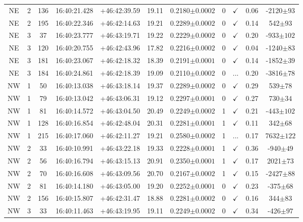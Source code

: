 \begin{landscape}
\begin{longtable}{ccccccccccc}
	NE & 2 & 136 & 16:40:21.428 & +46:42:39.59 & 19.11 & 0.2180$\pm{0.0002}$ & 0 & $\checkmark$ & 0.06 & -2120$\pm{93}$ \\
	NE & 2 & 195 & 16:40:22.346 & +46:42:14.63 & 19.21 & 0.2289$\pm{0.0002}$ & 0 & $\checkmark$ & 0.14 & 542$\pm{93}$ \\
	NE & 3 & 37 & 16:40:23.777 & +46:43:19.71 & 19.22 & 0.2229$\pm{0.0002}$ & 0 & $\checkmark$ & 0.20 & -933$\pm{102}$ \\
	NE & 3 & 120 & 16:40:20.755 & +46:42:43.96 & 17.82 & 0.2216$\pm{0.0002}$ & 0 & $\checkmark$ & 0.04 & -1240$\pm{83}$ \\
	NE & 3 & 181 & 16:40:23.067 & +46:42:18.32 & 18.39 & 0.2191$\pm{0.0001}$ & 0 & $\checkmark$ & 0.14 & -1852$\pm{39}$ \\
	NE & 3 & 184 & 16:40:24.861 & +46:42:18.39 & 19.09 & 0.2110$\pm{0.0002}$ & 0 & ... & 0.20 & -3816$\pm{78}$ \\
	NW & 1 & 50 & 16:40:13.038 & +46:43:18.14 & 19.37 & 0.2289$\pm{0.0002}$ & 0 & $\checkmark$ & 0.29 & 539$\pm{78}$ \\
	NW & 1 & 79 & 16:40:13.042 & +46:43:06.31 & 19.12 & 0.2297$\pm{0.0001}$ & 0 & $\checkmark$ & 0.27 & 730$\pm{34}$ \\
	NW & 1 & 81 & 16:40:14.572 & +46:43:04.50 & 20.49 & 0.2249$\pm{0.0002}$ & 1 & $\checkmark$ & 0.21 & -443$\pm{102}$ \\
	NW & 1 & 128 & 16:40:16.854 & +46:42:48.04 & 20.31 & 0.2281$\pm{0.0001}$ & 1 & $\checkmark$ & 0.11 & 342$\pm{68}$ \\
	NW & 1 & 215 & 16:40:17.060 & +46:42:11.27 & 19.21 & 0.2580$\pm{0.0002}$ & 1 & ... & 0.17 & 7632$\pm{122}$ \\
	NW & 2 & 33 & 16:40:10.991 & +46:43:22.18 & 19.33 & 0.2228$\pm{0.0001}$ & 1 & $\checkmark$ & 0.36 & -940$\pm{49}$ \\
	NW & 2 & 56 & 16:40:16.794 & +46:43:15.13 & 20.91 & 0.2350$\pm{0.0001}$ & 1 & $\checkmark$ & 0.17 & 2021$\pm{73}$ \\
	NW & 2 & 70 & 16:40:16.608 & +46:43:09.56 & 20.70 & 0.2167$\pm{0.0002}$ & 1 & $\checkmark$ & 0.15 & -2427$\pm{88}$ \\
	NW & 2 & 81 & 16:40:14.180 & +46:43:05.00 & 19.20 & 0.2252$\pm{0.0001}$ & 0 & $\checkmark$ & 0.23 & -375$\pm{68}$ \\
	NW & 2 & 156 & 16:40:15.807 & +46:42:31.47 & 18.88 & 0.2281$\pm{0.0002}$ & 0 & $\checkmark$ & 0.16 & 344$\pm{83}$ \\
	NW & 3 & 33 & 16:40:11.463 & +46:43:19.95 & 19.11 & 0.2249$\pm{0.0002}$ & 0 & $\checkmark$ & 0.34 & -426$\pm{97}$ \\

\end{longtable}
\end{landscape}
